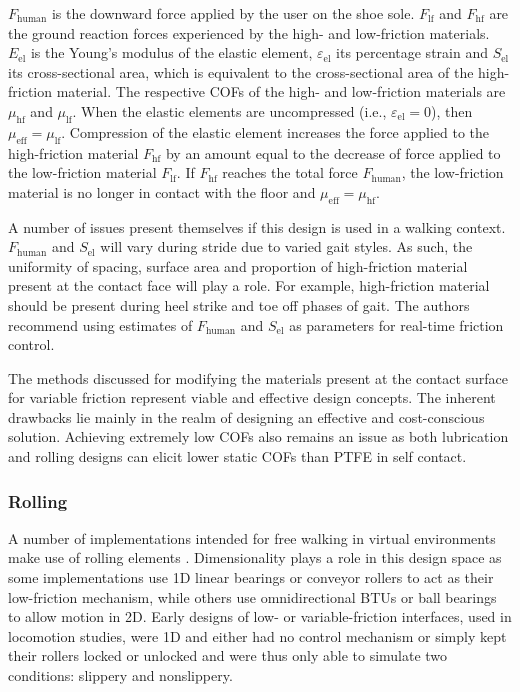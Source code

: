 \documentclass [12pt,letterpaper]{report}
\begin{document}
$F_\mathrm{human}$ is the downward force applied by the user on the shoe sole. $F_\mathrm{lf}$ and $F_\mathrm{hf}$ are the ground reaction forces experienced by the high- and low-friction materials. $E_\mathrm{el}$ is the Young's modulus of the elastic element, $\varepsilon_\mathrm{el}$ its percentage strain and $S_\mathrm{el}$ its cross-sectional area, which is equivalent to the cross-sectional area of the high-friction material. The respective COFs of the high- and low-friction materials are $\mu_\mathrm{hf}$ and $\mu_\mathrm{lf}$. When the elastic elements are uncompressed (i.e., $\varepsilon_\mathrm{el}=0$), then $\mu_\mathrm{eff} = \mu_\mathrm{lf}$. Compression of the elastic element increases the force applied to the high-friction material $F_\mathrm{hf}$ by an amount equal to the decrease of force applied to the low-friction material $F_\mathrm{lf}$. If $F_\mathrm{hf}$ reaches the total force $F_\mathrm{human}$, the low-friction material is no longer in contact with the floor and $\mu_\mathrm{eff} = \mu_\mathrm{hf}$.

A number of issues present themselves if this design is used in a walking context. $F_\mathrm{human}$ and $S_\mathrm{el}$ will vary during stride due to varied gait styles. As such, the uniformity of spacing, surface area and proportion of high-friction material present at the contact face will play a role. For example, high-friction material should be present during heel strike and toe off phases of gait. The authors recommend using estimates of $F_\mathrm{human}$ and $S_\mathrm{el}$ as parameters for real-time friction control.

The methods discussed for modifying the materials present at the contact surface for variable friction represent viable and effective design concepts. The inherent drawbacks lie mainly in the realm of designing an effective and cost-conscious solution. Achieving extremely low COFs also remains an issue as both lubrication and rolling designs can elicit lower static COFs than PTFE in self contact.


\subsubsection{Rolling}

A number of implementations intended for free walking in virtual environments make use of rolling elements \cite{huang2003omnidirectional,schwaiger20072d}. Dimensionality plays a role in this design space as some implementations use 1D linear bearings or conveyor rollers to act as their low-friction mechanism, while others use omnidirectional BTUs or ball bearings to allow motion in 2D. Early designs of low- or variable-friction interfaces, used in locomotion studies, were 1D and either had no control mechanism \cite{pai1999induced} or simply kept their rollers locked or unlocked \cite{marigold2002strategies} and were thus only able to simulate two conditions: slippery and nonslippery. 
\end{document}

